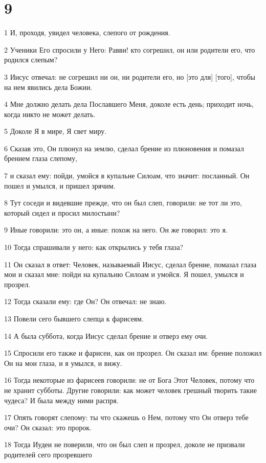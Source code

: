 \chapter{9}

\par 1 И, проходя, увидел человека, слепого от рождения.
\par 2 Ученики Его спросили у Него: Равви! кто согрешил, он или родители его, что родился слепым?
\par 3 Иисус отвечал: не согрешил ни он, ни родители его, но [это для] [того], чтобы на нем явились дела Божии.
\par 4 Мне должно делать дела Пославшего Меня, доколе есть день; приходит ночь, когда никто не может делать.
\par 5 Доколе Я в мире, Я свет миру.
\par 6 Сказав это, Он плюнул на землю, сделал брение из плюновения и помазал брением глаза слепому,
\par 7 и сказал ему: пойди, умойся в купальне Силоам, что значит: посланный. Он пошел и умылся, и пришел зрячим.
\par 8 Тут соседи и видевшие прежде, что он был слеп, говорили: не тот ли это, который сидел и просил милостыни?
\par 9 Иные говорили: это он, а иные: похож на него. Он же говорил: это я.
\par 10 Тогда спрашивали у него: как открылись у тебя глаза?
\par 11 Он сказал в ответ: Человек, называемый Иисус, сделал брение, помазал глаза мои и сказал мне: пойди на купальню Силоам и умойся. Я пошел, умылся и прозрел.
\par 12 Тогда сказали ему: где Он? Он отвечал: не знаю.
\par 13 Повели сего бывшего слепца к фарисеям.
\par 14 А была суббота, когда Иисус сделал брение и отверз ему очи.
\par 15 Спросили его также и фарисеи, как он прозрел. Он сказал им: брение положил Он на мои глаза, и я умылся, и вижу.
\par 16 Тогда некоторые из фарисеев говорили: не от Бога Этот Человек, потому что не хранит субботы. Другие говорили: как может человек грешный творить такие чудеса? И была между ними распря.
\par 17 Опять говорят слепому: ты что скажешь о Нем, потому что Он отверз тебе очи? Он сказал: это пророк.
\par 18 Тогда Иудеи не поверили, что он был слеп и прозрел, доколе не призвали родителей сего прозревшего
